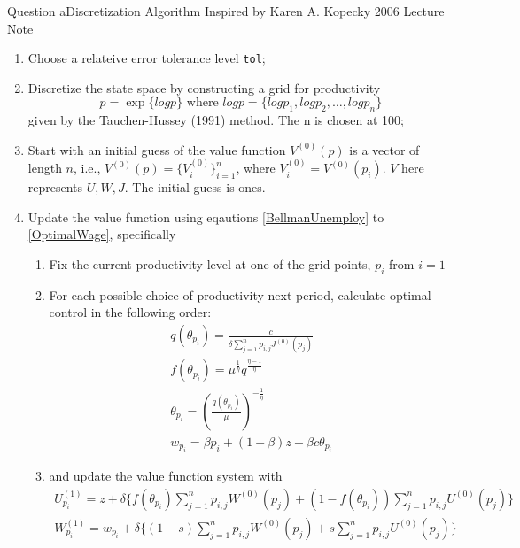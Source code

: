 \documentclass{beamer}
\begin{document}
\begin{frame}[allowframebreaks]{Question a}{Discretization Algorithm}
    Inspired by Karen A. Kopecky 2006 Lecture Note
    \begin{enumerate}
        \item Choose a relateive error tolerance level \texttt{tol};
        \item Discretize the state space by constructing a grid for productivity \[
            p = \exp\{logp\}
            \text{\ where\ } logp = \{logp_1, logp_2, \ldots, logp_n\} \] given by the Tauchen-Hussey (1991) method.
            The n is chosen at 100;
        \item Start with an initial guess of the value function \(V^{(0)}(p)\) is a vector of length \(n\), i.e., \(V^{(0)}(p) = \{V^{(0)}_i\}_{i=1}^n\), where \(V^{(0)}_i = V^{(0)}(p_i)\).
            \(V\) here represents \(U, W, J\). The initial guess is ones.
        \framebreak
        \label{update}
        \item Update the value function using eqautions \ref{BellmanUnemploy} to \ref{OptimalWage}, specifically
            \begin{enumerate}
                \item Fix the current productivity level at one of the grid points, \(p_i\) from \(i=1\)
                \item For each possible choice of productivity next period, calculate optimal control in the following order:
                \begin{gather*}
                    q(\theta_{p_i}) = \frac{c}{\delta \sum_{j=1}^{n}p_{i,j}J^{(0)}(p_j)}\\
                    f(\theta_{p_i}) = \mu^\frac{1}{\eta} q^\frac{\eta-1}{\eta}\\
                    \theta_{p_i} = (\frac{q(\theta_{p_i})}{\mu})^{-\frac{1}{\eta}}\\
                    w_{p_i} = \beta p_i + (1-\beta)z + \beta c \theta_{p_i}
                \end{gather*}
                \item and update the value function system with 
                \framebreak
                \begin{gather*}
                    U^{(1)}_{p_i} = z + \delta\{f(\theta_{p_i})\sum_{j=1}^{n}p_{i,j}W^{(0)}(p_j) + (1-f(\theta_{p_i}))\sum_{j=1}^{n}p_{i,j}U^{(0)}(p_j)\}\\
                    W^{(1)}_{p_i} = w_{p_i} + \delta\{(1-s)\sum_{j=1}^{n}p_{i,j}W^{(0)}(p_j) + s\sum_{j=1}^{n}p_{i,j}U^{(0)}(p_j)\}\\

\end{gather*}
\end{enumerate}
\end{enumerate}
\end{frame}
\end{document}
